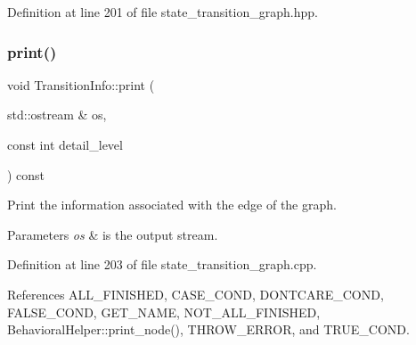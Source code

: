 Definition at line 201 of file state\+\_\+transition\+\_\+graph.\+hpp.

\mbox{\label{classTransitionInfo_a18cd68a222a448e60629d658803b9cf6}} 
\subsubsection{\texorpdfstring{print()}{print()}}
{\footnotesize\ttfamily void Transition\+Info\+::print (\begin{DoxyParamCaption}\item[{std\+::ostream \&}]{os,  }\item[{const int}]{detail\+\_\+level }\end{DoxyParamCaption}) const}



Print the information associated with the edge of the graph. 


\begin{DoxyParams}{Parameters}
{\em os} & is the output stream. \\
\hline
\end{DoxyParams}


Definition at line 203 of file state\+\_\+transition\+\_\+graph.\+cpp.



References A\+L\+L\+\_\+\+F\+I\+N\+I\+S\+H\+ED, C\+A\+S\+E\+\_\+\+C\+O\+ND, D\+O\+N\+T\+C\+A\+R\+E\+\_\+\+C\+O\+ND, F\+A\+L\+S\+E\+\_\+\+C\+O\+ND, G\+E\+T\+\_\+\+N\+A\+ME, N\+O\+T\+\_\+\+A\+L\+L\+\_\+\+F\+I\+N\+I\+S\+H\+ED, Behavioral\+Helper\+::print\+\_\+node(), T\+H\+R\+O\+W\+\_\+\+E\+R\+R\+OR, and T\+R\+U\+E\+\_\+\+C\+O\+ND.

